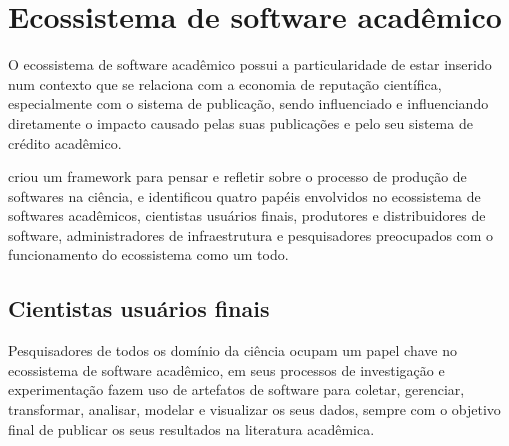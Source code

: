 \section{Ecossistema de software acadêmico}

O ecossistema de software acadêmico possui a particularidade de estar inserido
num contexto que se relaciona com a economia de reputação científica,
especialmente com o sistema de publicação, sendo influenciado e influenciando
diretamente o impacto causado pelas suas publicações e pelo seu sistema de crédito
acadêmico.


 criou um framework para pensar e refletir
sobre o processo de produção de softwares na ciência, e identificou quatro
papéis envolvidos no ecossistema de softwares acadêmicos, cientistas usuários
finais, produtores e distribuidores de software, administradores de
infraestrutura e pesquisadores preocupados com o funcionamento do ecossistema
como um todo.



\subsection{Cientistas usuários finais}

Pesquisadores de todos os domínio da ciência ocupam um papel chave no
ecossistema de software acadêmico, em seus processos de investigação e
experimentação fazem uso de artefatos de software para coletar, gerenciar,
transformar, analisar, modelar e visualizar os seus dados, sempre com o
objetivo final de publicar os seus resultados na literatura acadêmica.

